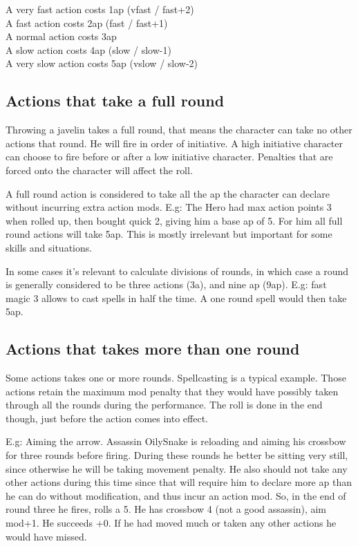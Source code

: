 A very fast action costs 1ap (vfast / fast+2) \\
A fast action costs 2ap (fast / fast+1) \\
A normal action costs 3ap \\
A slow action costs 4ap (slow / slow-1) \\
A very slow action costs 5ap (vslow / slow-2)


\subsection*{Actions that take a full round}
Throwing a javelin takes a full round, that means the character can take no other actions that round. He will fire in order of initiative. A high initiative character can choose to fire before or after a low initiative character.  Penalties that are forced onto the character will affect the roll.

A full round action is considered to take all the ap the character can declare without incurring extra action mods. E.g: The Hero had max action points 3 when rolled up, then bought quick 2, giving him a base ap of 5. For him all full round actions will take 5ap. This is mostly irrelevant but important for some skills and situations.

In some cases it's relevant to calculate divisions of rounds, in which case a round is generally considered to be three actions (3a), and nine ap (9ap). %
E.g: fast magic 3 allows to cast spells in half the time. A one round spell would then take 5ap.


\subsection*{Actions that takes more than one round}
Some actions takes one or more rounds. Spellcasting is a typical example. Those actions retain the maximum mod penalty that they would have possibly taken through all the rounds during the performance. The roll is done in the end though, just before the action comes into effect.

E.g: Aiming the arrow. Assassin OilySnake is reloading and aiming his crossbow for three rounds before firing. During these rounds he better be sitting very still, since otherwise he will be taking movement penalty. He also should not take any other actions during this time since that will require him to declare more ap than he can do without modification, and thus incur an action mod. So, in the end of round three he fires, rolls a 5. He has crossbow 4 (not a good assassin), aim mod+1. He succeeds +0. If he had moved much or taken any other actions he would have missed.

